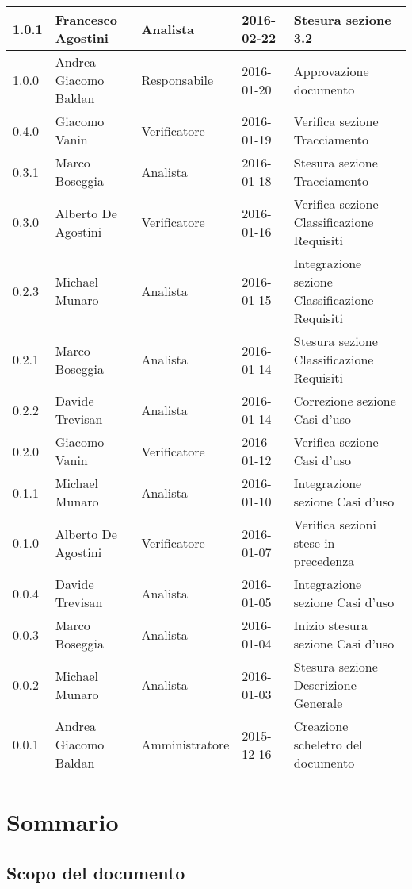 \documentclass{scalatekids-article}
\begin{document}
\begin{center}
\begin{tabular}{| l | l | l | l | p{5cm} |}
    \hline
    1.0.1 & Francesco Agostini & Analista & 2016-02-22 & Stesura sezione 3.2\\
    \hline
    1.0.0 & Andrea Giacomo Baldan & Responsabile & 2016-01-20 & Approvazione documento\\
    \hline
    0.4.0 & Giacomo Vanin & Verificatore & 2016-01-19 & Verifica sezione Tracciamento\\
    \hline
    0.3.1 & Marco Boseggia & Analista & 2016-01-18 & Stesura sezione Tracciamento\\
    \hline
    0.3.0 & Alberto De Agostini & Verificatore & 2016-01-16 & Verifica sezione Classificazione Requisiti\\
    \hline
    0.2.3 & Michael Munaro & Analista & 2016-01-15 & Integrazione sezione Classificazione Requisiti\\
    \hline
    0.2.1 & Marco Boseggia & Analista & 2016-01-14 & Stesura sezione Classificazione Requisiti\\
    \hline
    0.2.2 & Davide Trevisan & Analista & 2016-01-14 & Correzione sezione Casi d'uso\\
    \hline
    0.2.0 & Giacomo Vanin & Verificatore & 2016-01-12 & Verifica sezione Casi d'uso\\
    \hline
    0.1.1 & Michael Munaro & Analista & 2016-01-10 & Integrazione sezione Casi d'uso\\
    \hline
    0.1.0 & Alberto De Agostini & Verificatore & 2016-01-07 & Verifica sezioni stese in precedenza\\
    \hline
    0.0.4 & Davide Trevisan & Analista & 2016-01-05 & Integrazione sezione Casi d'uso\\
    \hline
    0.0.3 & Marco Boseggia & Analista & 2016-01-04 & Inizio stesura sezione Casi d'uso\\
    \hline
    0.0.2 & Michael Munaro & Analista & 2016-01-03 & Stesura sezione Descrizione Generale\\
    \hline
    0.0.1 & Andrea Giacomo Baldan & Amministratore & 2015-12-16 & Creazione scheletro del documento\\
    \hline
  \end{tabular}
\end{center}
\tableofcontents
\newpage
{}

\section{Sommario}

\subsection{Scopo del documento}
\end{document}
